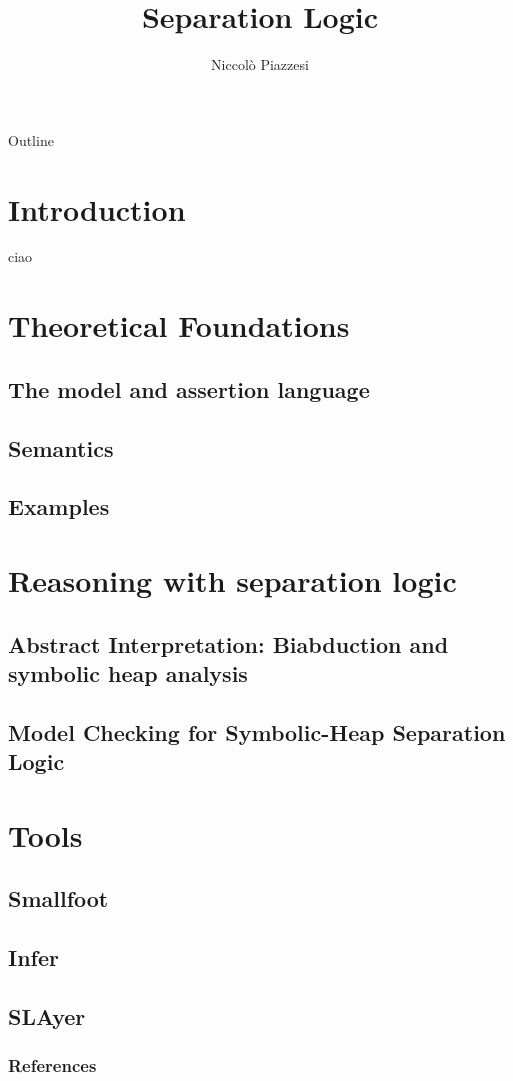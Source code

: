 \documentclass{beamer}
\title{Separation Logic}
\author{Niccolò Piazzesi}
\institute[UniPi]{
    Università degli studi di Pisa \\
    Anno Accademico 2021-22
}
\begin{document}
    \begin{frame}
        \maketitle
    \end{frame}
    \begin{frame}{Outline}
        \tableofcontents[hideallsubsections]
    \end{frame}
    \section{Introduction}

    \begin{frame}
        ciao \cite{o2001local}
    \end{frame}
    \section{Theoretical Foundations}
    \subsection{The model and assertion language}
    \subsection{Semantics}
    \subsection{Examples}
    \section{Reasoning with separation logic}
    \subsection{Abstract Interpretation: Biabduction and symbolic heap  analysis}
    \subsection{Model Checking for Symbolic-Heap Separation Logic }
    \section{Tools}
    \subsection{Smallfoot}
    \subsection{Infer}
    \subsection{SLAyer}
    \begin{frame}[allowframebreaks]
     
        \frametitle{References}
        
        
    \end{frame}
\end{document}
